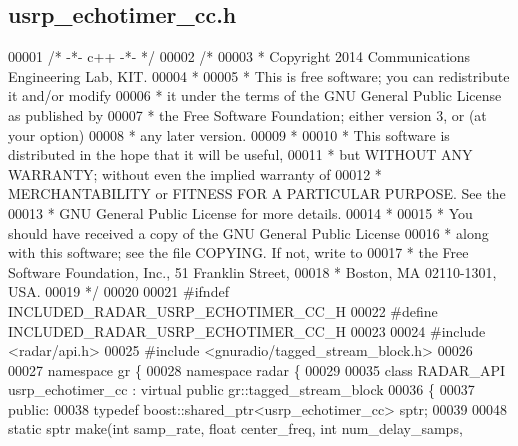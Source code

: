 \subsection{usrp\+\_\+echotimer\+\_\+cc.\+h}
\label{usrp__echotimer__cc_8h_source}

\begin{DoxyCode}
00001 \textcolor{comment}{/* -*- c++ -*- */}
00002 \textcolor{comment}{/* }
00003 \textcolor{comment}{ * Copyright 2014 Communications Engineering Lab, KIT.}
00004 \textcolor{comment}{ * }
00005 \textcolor{comment}{ * This is free software; you can redistribute it and/or modify}
00006 \textcolor{comment}{ * it under the terms of the GNU General Public License as published by}
00007 \textcolor{comment}{ * the Free Software Foundation; either version 3, or (at your option)}
00008 \textcolor{comment}{ * any later version.}
00009 \textcolor{comment}{ * }
00010 \textcolor{comment}{ * This software is distributed in the hope that it will be useful,}
00011 \textcolor{comment}{ * but WITHOUT ANY WARRANTY; without even the implied warranty of}
00012 \textcolor{comment}{ * MERCHANTABILITY or FITNESS FOR A PARTICULAR PURPOSE.  See the}
00013 \textcolor{comment}{ * GNU General Public License for more details.}
00014 \textcolor{comment}{ * }
00015 \textcolor{comment}{ * You should have received a copy of the GNU General Public License}
00016 \textcolor{comment}{ * along with this software; see the file COPYING.  If not, write to}
00017 \textcolor{comment}{ * the Free Software Foundation, Inc., 51 Franklin Street,}
00018 \textcolor{comment}{ * Boston, MA 02110-1301, USA.}
00019 \textcolor{comment}{ */}
00020 
00021 \textcolor{preprocessor}{#ifndef INCLUDED\_RADAR\_USRP\_ECHOTIMER\_CC\_H}
00022 \textcolor{preprocessor}{#define INCLUDED\_RADAR\_USRP\_ECHOTIMER\_CC\_H}
00023 
00024 \textcolor{preprocessor}{#include <radar/api.h>}
00025 \textcolor{preprocessor}{#include <gnuradio/tagged\_stream\_block.h>}
00026 
00027 \textcolor{keyword}{namespace }gr \{
00028   \textcolor{keyword}{namespace }radar \{
00029 
00035     \textcolor{keyword}{class }RADAR_API usrp_echotimer_cc : \textcolor{keyword}{virtual} \textcolor{keyword}{public} gr::tagged\_stream\_block
00036     \{
00037      \textcolor{keyword}{public}:
00038       \textcolor{keyword}{typedef} boost::shared\_ptr<usrp\_echotimer\_cc> sptr;
00039 
00048       \textcolor{keyword}{static} sptr make(\textcolor{keywordtype}{int} samp_rate, \textcolor{keywordtype}{float} center_freq, \textcolor{keywordtype}{int} num\_delay\_samps,

\end{DoxyCode}
